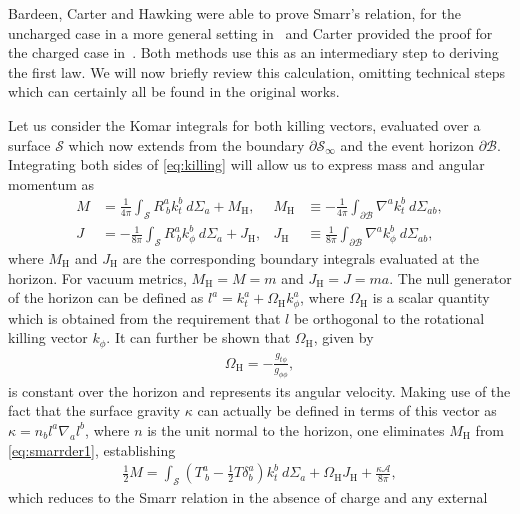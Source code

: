 \documentclass[
twoside,openright,frontopenright]{dmathesis}
\newcommand{\nn}{\nonumber}
\begin{document}
Bardeen, Carter and Hawking were able to prove Smarr's relation, for the
uncharged case in a more general setting in~\cite{Bardeen:1973gs} and Carter
provided the proof for the charged case
in~\cite{Carter:1973rla,Carter2010}. Both methods use this as an intermediary
step to deriving the first law. We will now briefly review this calculation,
omitting technical steps which can certainly all be found in the original works.

Let us consider the Komar integrals for both killing vectors, evaluated over a
surface $\mathcal{S}$ which now extends from the boundary
$\partial \mathcal{S}_\infty$ and the event horizon $\partial
\mathcal{B}$. Integrating both sides of \cref{eq:killing} will allow us to
express mass and angular momentum as
\begin{align}
  M &= \frac{1}{4\pi}\int_\mathcal{S} R^a_{~b}k^b_t ~d\Sigma_a + M_\mathrm{H}, 
  &M_\mathrm{H} &\equiv -\frac{1}{4\pi}\int_{\partial \mathcal{B}}\nabla^a k_t^b ~ d\Sigma_{ab},\nn\\
  J &= -\frac{1}{8\pi}\int_\mathcal{S} R^a_{~b}k^b_\phi ~d\Sigma_a + J_\mathrm{H}, 
  &J_\mathrm{H} &\equiv \frac{1}{8\pi}\int_{\partial\mathcal{B}}\nabla^a k_\phi^b ~ d\Sigma_{ab},
\label{eq:smarrder1}
\end{align}
where $M_\mathrm{H}$ and $J_\mathrm{H}$ are the corresponding boundary integrals
evaluated at the horizon. For vacuum metrics, $M_\mathrm{H}=M=m$ and
$J_\mathrm{H}=J=ma$. The null generator of the horizon can be defined as
$l^a = k_t^a + \Omega_\mathrm{H} k_\phi^a$, where $\Omega_\mathrm{H}$ is a
scalar quantity which is obtained from the requirement that $l$ be orthogonal to
the rotational killing vector $k_\phi$. It can further be shown that
$\Omega_\mathrm{H}$, given by
\begin{align}
  \label{eq:angularvelocity}
  \Omega_\mathrm{H} = -\frac{g_{t\phi}}{g_{\phi\phi}},
\end{align}
is constant over the horizon and represents its angular velocity. Making use of
the fact that the surface gravity $\kappa$ can actually be defined in terms of
this vector as $\kappa = n_bl^a\nabla_al^b$, where $n$ is the unit normal to the
horizon, one eliminates $M_\mathrm{H}$ from \cref{eq:smarrder1}, establishing
\begin{align}
  \label{eq:smarrder2}
  \frac12 M = \int_\mathcal{S} \left(T^a_{~b} - \frac12 T \delta^a_b\right)k_t^b~d\Sigma_a + \Omega_\mathrm{H}
  J_\mathrm{H} + \frac{\kappa \mathcal{A}}{8\pi},
\end{align}
which reduces to the Smarr relation in the absence of charge and any external
\end{document}

